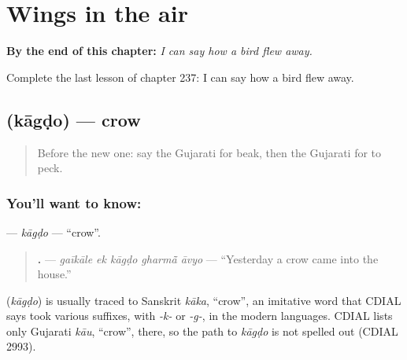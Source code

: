 
\chapter{Wings in the air}
\label{ch:gu-wings-in-the-air}

\begin{chapteropening}
\textbf{By the end of this chapter:} \emph{I can say how a bird flew away.}

Complete the last lesson of chapter 237: I can say how a bird flew away.
\end{chapteropening}

\section[\texorpdfstring{\gu{કાગડો} (kāgḍo)}{કાગડો (kāgḍo)}]{ (kāgḍo) — crow}

\label{lesson:GU-C237-kagdo}



\begin{quote}
Before the new one: say the Gujarati for beak, then the Gujarati for to peck.
\end{quote}

\subsection*{You'll want to know: }
\textbf{} — \emph{kāgḍo} — \textquotedblleft{}crow\textquotedblright{}.

\begin{quote}
\textbf{    .} — \emph{gaīkāle ek kāgḍo gharmā̃ āvyo} — \textquotedblleft{}Yesterday a crow came into the house.\textquotedblright{}
\end{quote}

\begin{cousinweb}
\textbf{} (\emph{kāgḍo}) is usually traced to Sanskrit \emph{kāka}, \textquotedblleft{}crow\textquotedblright{}, an imitative word that CDIAL says took various suffixes, with \emph{-k-} or \emph{-g-}, in the modern languages. CDIAL lists only Gujarati \emph{kāu}, \textquotedblleft{}crow\textquotedblright{}, there, so the path to \emph{kāgḍo} is not spelled out (CDIAL 2993).
\end{cousinweb}

